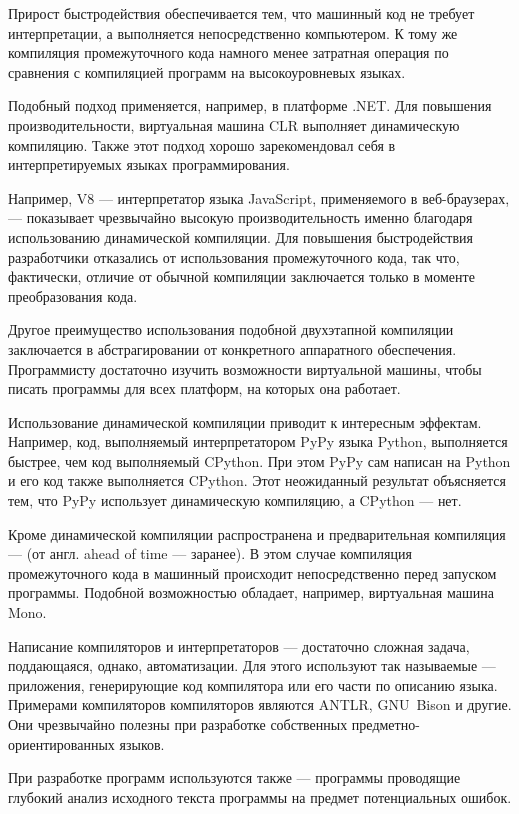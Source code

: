 Прирост быстродействия обеспечивается тем, что машинный код не требует
интерпретации, а выполняется непосредственно компьютером. К тому же
компиляция промежуточного кода намного менее затратная операция по
сравнения с компиляцией программ на высокоуровневых языках.

Подобный подход применяется, например, в платформе .NET. Для повышения
производительности, виртуальная машина CLR выполняет динамическую
компиляцию. Также этот подход хорошо зарекомендовал себя в
интерпретируемых языках программирования.

Например, V8 — интерпретатор языка JavaScript, применяемого в
веб-браузерах, — показывает чрезвычайно высокую производительность
именно благодаря использованию динамической компиляции. Для повышения
быстродействия разработчики отказались от использования промежуточного
кода, так что, фактически, отличие от обычной компиляции заключается
только в моменте преобразования кода.

Другое преимущество использования подобной двухэтапной компиляции
заключается в абстрагировании от конкретного аппаратного
обеспечения. Программисту достаточно изучить возможности виртуальной
машины, чтобы писать программы для всех платформ, на которых она
работает.

Использование динамической компиляции приводит к интересным эффектам.
Например, код, выполняемый интерпретатором PyPy языка Python,
выполняется быстрее, чем код выполняемый CPython. При этом PyPy сам
написан на Python и его код также выполняется CPython. Этот
неожиданный результат объясняется тем, что PyPy использует
динамическую компиляцию, а CPython — нет.

Кроме динамической компиляции распространена и предварительная
компиляция —  (от англ. ahead of
time — заранее). В этом случае компиляция промежуточного кода в
машинный происходит непосредственно перед запуском программы. Подобной
возможностью обладает, например, виртуальная машина Mono.

Написание компиляторов и интерпретаторов — достаточно сложная задача,
поддающаяся, однако, автоматизации. Для этого используют так
называемые  —
приложения, генерирующие код компилятора или его части по описанию
языка. Примерами компиляторов компиляторов являются ANTLR, GNU~Bison и
другие. Они чрезвычайно полезны при разработке собственных
предметно-ориентированных языков.

При разработке программ используются также
 — программы
проводящие глубокий анализ исходного текста программы на предмет
потенциальных ошибок.

